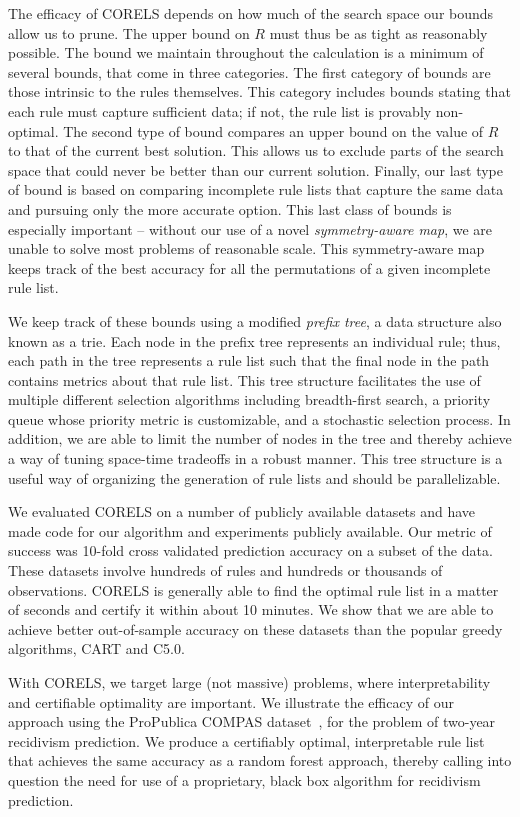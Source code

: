 The efficacy of CORELS depends on how much of the search space our bounds allow us to prune. The upper bound on $R$ must thus be as tight as reasonably possible. The bound we maintain throughout the calculation is a minimum of several bounds, that come in three categories. The first category of bounds are those intrinsic to the rules themselves. This category includes bounds stating that each rule must capture sufficient data; if not, the rule list is provably non-optimal. The second type of bound compares an upper bound on the value of $R$ to that of the current best solution. This allows us to exclude parts of the search space that could never be better than our current solution. Finally, our last type of bound is based on comparing incomplete rule lists that capture the same data and pursuing only the more accurate option. This last class of bounds is especially important -- without our use of a novel \textit{symmetry-aware map}, we are unable to solve most problems of reasonable scale. This symmetry-aware map keeps track of the best accuracy for all the permutations of a given incomplete rule list.

We keep track of these bounds using a modified \emph{prefix tree},
a data structure also known as a trie.
%
Each node in the prefix tree represents an individual rule;
thus, each path in the tree represents a rule list such that
the final node in the path contains metrics about that rule list.
%
This tree structure facilitates the use of multiple different selection algorithms including breadth-first search, a priority queue whose priority metric is customizable, and a stochastic selection process. In addition, we are able to limit the number of nodes in the tree and thereby achieve a way of tuning space-time tradeoffs in a robust manner. This tree structure is a useful way of organizing the generation of rule lists and should be parallelizable.

\begin{arxiv}
We evaluated CORELS on a number of publicly available datasets and have made code for our algorithm and experiments publicly available. Our metric of success was 10-fold cross validated prediction accuracy on a subset of the data. These datasets involve hundreds of rules and hundreds or thousands of observations. CORELS is generally able to find the optimal rule list in a matter of seconds and certify it within about 10 minutes. We show that we are able to achieve better out-of-sample accuracy on these datasets than the popular greedy algorithms, CART and C5.0.
\end{arxiv}

With CORELS, we target large (not massive) problems,
where interpretability and certifiable optimality are important.
%
We illustrate the efficacy of our approach using the ProPublica COMPAS dataset~\cite{LarsonMaKiAn16}, for the problem of two-year recidivism prediction.
%
We produce a certifiably optimal, interpretable rule list that achieves
the same accuracy as a random forest approach, thereby calling into question
the need for use of a proprietary, black box algorithm for recidivism prediction.

%
%
%
%
